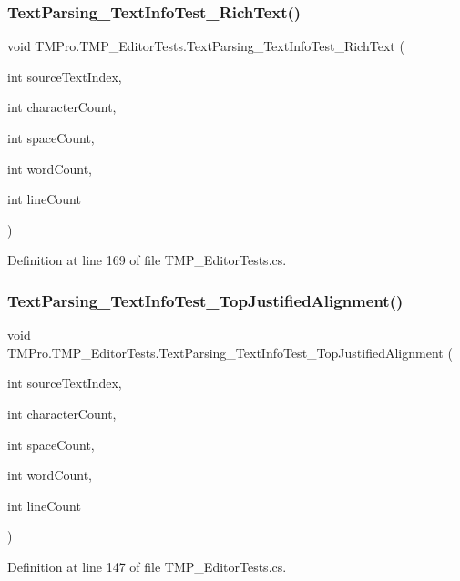 \subsubsection{\texorpdfstring{TextParsing\_TextInfoTest\_RichText()}{TextParsing\_TextInfoTest\_RichText()}}
{\footnotesize\ttfamily void T\+M\+Pro.\+T\+M\+P\+\_\+\+Editor\+Tests.\+Text\+Parsing\+\_\+\+Text\+Info\+Test\+\_\+\+Rich\+Text (\begin{DoxyParamCaption}\item[{int}]{source\+Text\+Index,  }\item[{int}]{character\+Count,  }\item[{int}]{space\+Count,  }\item[{int}]{word\+Count,  }\item[{int}]{line\+Count }\end{DoxyParamCaption})}



Definition at line 169 of file T\+M\+P\+\_\+\+Editor\+Tests.\+cs.

\mbox{\label{class_t_m_pro_1_1_t_m_p___editor_tests_afca8b24280f94e1956a4808db574b4c3}} 
\subsubsection{\texorpdfstring{TextParsing\_TextInfoTest\_TopJustifiedAlignment()}{TextParsing\_TextInfoTest\_TopJustifiedAlignment()}}
{\footnotesize\ttfamily void T\+M\+Pro.\+T\+M\+P\+\_\+\+Editor\+Tests.\+Text\+Parsing\+\_\+\+Text\+Info\+Test\+\_\+\+Top\+Justified\+Alignment (\begin{DoxyParamCaption}\item[{int}]{source\+Text\+Index,  }\item[{int}]{character\+Count,  }\item[{int}]{space\+Count,  }\item[{int}]{word\+Count,  }\item[{int}]{line\+Count }\end{DoxyParamCaption})}



Definition at line 147 of file T\+M\+P\+\_\+\+Editor\+Tests.\+cs.

